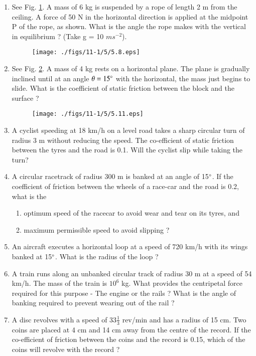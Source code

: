 \begin{enumerate}[label=\thesection.\arabic*.,ref=\thesection.\theenumi]
\item See Fig. \ref{fig:5.8}. A mass of 6 kg is suspended by a rope of length 2 m from the ceiling. A force of 50 N in the horizontal direction is applied at the midpoint P of the rope, as shown. What is the angle the rope makes with the vertical in equilibrium ? (Take g = 10 $m s^{-2}$).
\begin{figure}[!ht]
\centering
\texttt{[image: ./figs/11-1/5/5.8.eps]}
\caption{}
\label{fig:5.8}
\end{figure} 
\item See Fig. \ref{fig:5.11}. A mass of 4 kg rests on a horizontal plane. The plane is gradually inclined until at an angle $\theta = 15\degree$ with the horizontal, the mass just begins to slide. What is the coefficient of static friction between the block and the surface ?
\begin{figure}[!ht]
\centering
\texttt{[image: ./figs/11-1/5/5.11.eps]}
\caption{}
\label{fig:5.11}
\end{figure} 
\item A cyclist speeding at 18 km/h on a level road takes a sharp circular turn of radius 3 m without reducing the speed. The co-efficient of static friction between the tyres and the road is 0.1. Will the cyclist slip while taking the turn?
\item A circular racetrack of radius 300 m is banked at an angle of 15$\degree$. If the coefficient of friction between the wheels of a race-car and the road is 0.2, what is the 
\begin{enumerate}
\item  optimum speed of the racecar to avoid wear and tear on its tyres, and 
\item  maximum permissible speed to avoid slipping ?
\end{enumerate}
\item An aircraft executes a horizontal loop at a speed of 720 km/h with its wings banked at 15$\degree$. What is the radius of the loop ?
\item A train runs along an unbanked circular track of radius 30 m at a speed of 54 km/h. The mass of the train is $10^6$
kg. What provides the centripetal force required for this
purpose - The engine or the rails ? What is the angle of banking required to prevent wearing out of the rail ?
\item A disc revolves with a speed of $33 \frac{1}{ 3}$ rev/min 
 and has a radius of 15 cm. Two coins are
placed at 4 cm and 14 cm away from the centre of the record. If the co-efficient of friction between the coins and the record is 0.15, which of the coins will revolve with the record ?

\end{enumerate}

